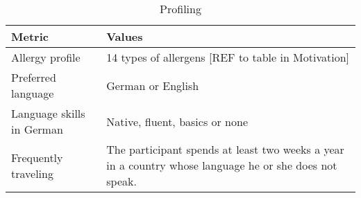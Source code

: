 \begin{table}[H]
\centering
\begin{tabular}{l l}
\toprule
Metric & Values\\
\midrule
Allergy profile   &	14 types of allergens [REF to table in Motivation] \\
Preferred language   &	German or English \\
Language skills in German  &	Native, fluent, basics or none \\
Frequently traveling   &	The participant spends at least two weeks a year in a country whose language he or she does not speak. \\
\bottomrule
\end{tabular}
\caption{Profiling}
\end{table}